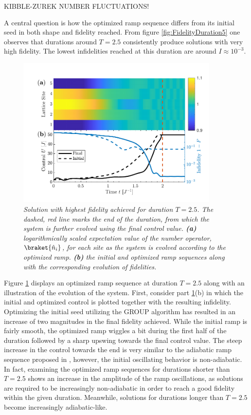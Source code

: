 KIBBLE-ZUREK NUMBER FLUCTUATIONS!

A central question is how the optimized ramp sequence differs from its initial seed in both shape and fidelity reached. From figure \ref{fig:FidelityDuration5} one observes that durations around $T = 2.5$ consistently produce solutions with very high fidelity. The lowest infidelities reached at this duration are around $I \approx 10^{-3}$. 
\begin{figure}[h!]
    \centering
    \includegraphics[width=0.9\textwidth]{Figures/L5/RampPlot.pdf}
    \caption{\textit{Solution with highest fidelity achieved for duration $T = 2.5$. The dashed, red line marks the end of the duration, from which the system is further evolved using the final control value. \textbf{(a)} logarithmically scaled expectation value of the number operator, $\braket{\hat{n}_i}$, for each site as the system is evolved according to the optimized ramp. \textbf{(b)} the initial and optimized ramp sequences along with the corresponding evolution of fidelities.}}
    \label{fig:ExtendedRamp5}
\end{figure}
Figure \ref{fig:ExtendedRamp5} displays an optimized ramp sequence at duration $T = 2.5$ along with an illustration of the evolution of the system. First, consider part \ref{fig:ExtendedRamp5}(b) in which the initial and optimized control is plotted together with the resulting infidelity. Optimizing the initial seed utilizing the GROUP algorithm has resulted in an increase of two magnitudes in the final fidelity achieved.
While the initial ramp is fairly smooth, the optimized ramp wiggles a bit during the first half of the duration followed by a sharp upswing towards the final control value. The steep increase in the control towards the end is very similar to the adiabatic ramp sequence proposed in \cite{Zakrzewski2009}, however, the initial oscillating behavior is non-adiabatic. In fact, examining the optimized ramp sequences for durations shorter than $T = 2.5$ shows an increase in the amplitude of the ramp oscillations, as solutions are required to be increasingly non-adiabatic in order to reach a good fidelity within the given duration. Meanwhile, solutions for durations longer than $T = 2.5$ become increasingly adiabatic-like.\\
